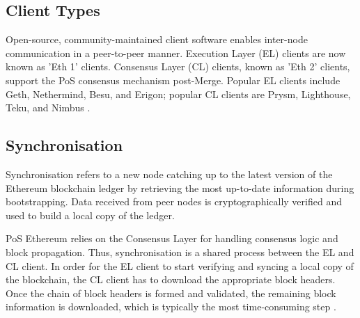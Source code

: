 \subsection{Client Types}

Open-source, community-maintained client software enables inter-node communication in a peer-to-peer manner. Execution Layer (EL) clients are now known as 'Eth 1' clients. Consensus Layer (CL) clients, known as 'Eth 2' clients, support the PoS consensus mechanism post-Merge. Popular EL clients include Geth, Nethermind, Besu, and Erigon; popular CL clients are Prysm, Lighthouse, Teku, and Nimbus \cite{EthereumEthereum.org}.







\subsection{Synchronisation} 
\label{SyncLitRev}

Synchronisation refers to a new node catching up to the latest version of the Ethereum blockchain ledger by retrieving the most up-to-date information during bootstrapping. Data received from peer nodes is cryptographically verified and used to build a local copy of the ledger.

PoS Ethereum relies on the Consensus Layer for handling consensus logic and block propagation. Thus, synchronisation is a shared process between the EL and CL client. In order for the EL client to start verifying and syncing a local copy of the blockchain, the CL client has to download the appropriate block headers. Once the chain of block headers is formed and validated, the remaining block information is downloaded, which is typically the most time-consuming step \cite{2022DeveloperGo-ethereum}.

